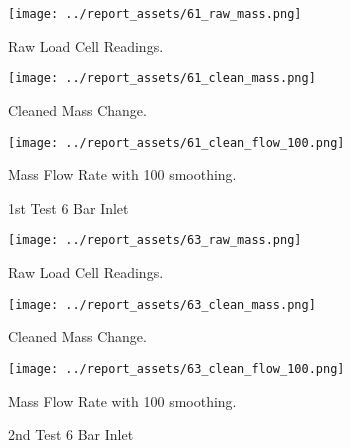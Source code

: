 \begin{figure}[htbp]
    \centering

    \begin{minipage}{0.3\textwidth}
        \centering
        \texttt{[image: ../report\_assets/61\_raw\_mass.png]}
        \caption*{Raw Load Cell Readings.}
    \end{minipage}
    \hfill
    \begin{minipage}{0.3\textwidth}
        \centering
        \texttt{[image: ../report\_assets/61\_clean\_mass.png]}
        \caption*{Cleaned Mass Change.}
    \end{minipage}
    \hfill
    \begin{minipage}{0.3\textwidth}
        \centering
        \texttt{[image: ../report\_assets/61\_clean\_flow\_100.png]}
        \caption*{Mass Flow Rate with 100 smoothing.}
    \end{minipage}
    \caption{1st Test 6 Bar Inlet}
    
\end{figure}\label{fig:61}

\begin{figure}[htbp]
    \centering

    \begin{minipage}{0.3\textwidth}
        \centering
        \texttt{[image: ../report\_assets/63\_raw\_mass.png]}
        \caption*{Raw Load Cell Readings.}
    \end{minipage}
    \hfill
    \begin{minipage}{0.3\textwidth}
        \centering
        \texttt{[image: ../report\_assets/63\_clean\_mass.png]}
        \caption*{Cleaned Mass Change.}
    \end{minipage}
    \hfill
    \begin{minipage}{0.3\textwidth}
        \centering
        \texttt{[image: ../report\_assets/63\_clean\_flow\_100.png]}
        \caption*{Mass Flow Rate with 100 smoothing.}
    \end{minipage}
    \caption{2nd Test 6 Bar Inlet}
    
\end{figure}\label{fig:63}

